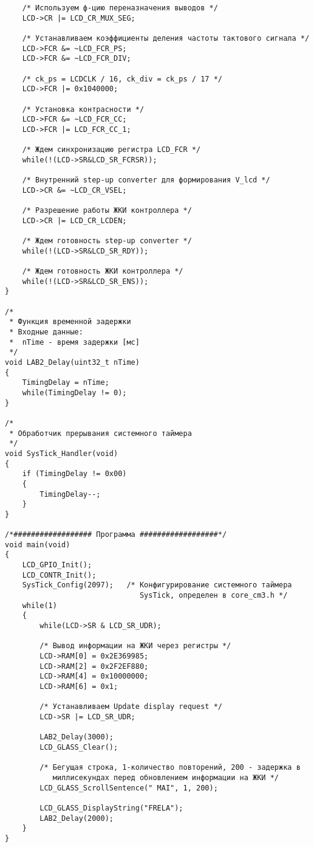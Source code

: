 \begin{verbatim}
    /* Используем ф-цию переназначения выводов */
    LCD->CR |= LCD_CR_MUX_SEG;

    /* Устанавливаем коэффициенты деления частоты тактового сигнала */
    LCD->FCR &= ~LCD_FCR_PS;
    LCD->FCR &= ~LCD_FCR_DIV;

    /* ck_ps = LCDCLK / 16, ck_div = ck_ps / 17 */
    LCD->FCR |= 0x1040000;

    /* Установка контрасности */
    LCD->FCR &= ~LCD_FCR_CC;
    LCD->FCR |= LCD_FCR_CC_1;

    /* Ждем синхронизацию регистра LCD_FCR */
    while(!(LCD->SR&LCD_SR_FCRSR));

    /* Внутренний step-up converter для формирования V_lcd */
    LCD->CR &= ~LCD_CR_VSEL;

    /* Разрешение работы ЖКИ контроллера */
    LCD->CR |= LCD_CR_LCDEN;

    /* Ждем готовность step-up converter */
    while(!(LCD->SR&LCD_SR_RDY));

    /* Ждем готовность ЖКИ контроллера */
    while(!(LCD->SR&LCD_SR_ENS));
}

/*
 * Функция временной задержки
 * Входные данные:
 *  nTime - время задержки [мс]
 */
void LAB2_Delay(uint32_t nTime)
{
    TimingDelay = nTime;
    while(TimingDelay != 0);
}

/*
 * Обработчик прерывания системного таймера
 */
void SysTick_Handler(void)
{
    if (TimingDelay != 0x00)
    {
        TimingDelay--;
    }
}

/*################## Программа ##################*/
void main(void)
{
    LCD_GPIO_Init();
    LCD_CONTR_Init();
    SysTick_Config(2097);   /* Конфигурирование системного таймера 
                               SysTick, определен в core_cm3.h */
    while(1)
    {
        while(LCD->SR & LCD_SR_UDR);
        
        /* Вывод информации на ЖКИ через регистры */
        LCD->RAM[0] = 0x2E369985;
        LCD->RAM[2] = 0x2F2EF880;
        LCD->RAM[4] = 0x10000000;
        LCD->RAM[6] = 0x1;

        /* Устанавливаем Update display request */
        LCD->SR |= LCD_SR_UDR;
        
        LAB2_Delay(3000);
        LCD_GLASS_Clear();

        /* Бегущая строка, 1-количество повторений, 200 - задержка в
           миллисекундах перед обновлением информации на ЖКИ */
        LCD_GLASS_ScrollSentence(" MAI", 1, 200);

        LCD_GLASS_DisplayString("FRELA");
        LAB2_Delay(2000);
    }
}
\end{verbatim}